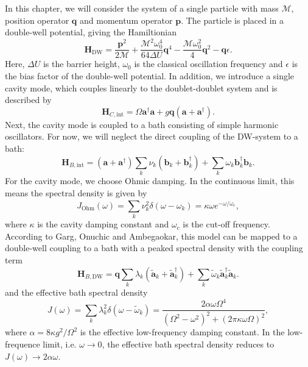 In this chapter, we will consider the system of a single particle with mass $\mathcal{M}$, 
position operator $\mathbf{q}$ and momentum operator $\mathbf{p}$.
The particle is placed in a double-well potential, giving the Hamiltionian
%
\begin{equation}\label{DW_hamiltonian}
    \mathbf{H}_{\text{DW}} = \frac{\mathbf{p}^2}{2 \mathcal{M}}  
    + \frac{\mathcal{M}^2 \omega_0^4}{64 \Delta U} \mathbf{q}^4 
    - \frac{\mathcal{M} \omega_0^2}{4} \mathbf{q}^2
    - \mathbf{q} \epsilon .
\end{equation}
%
Here, $\Delta U$ is the barrier height, $\omega_0$ is the classical oscillation frequency
and $\epsilon$ is the bias factor of the double-well potential.
In addition, we introduce a single cavity mode, which couples linearly to the doublet-doublet
system and is described by
%
\begin{equation}
    \mathbf{H}_{C,\text{int}} = \Omega \mathbf{a}^{\dagger} \mathbf{a}
    + g \mathbf{q} \left( \mathbf{a} + \mathbf{a}^{\dagger} \right) .
\end{equation}
%
Next, the cavity mode is coupled to a bath consisting of simple harmonic oscillators. 
For now, we will neglect the direct coupling of the DW-system to a bath:
%
\begin{equation}
    \mathbf{H}_{B,\text{int}} = \left( \mathbf{a} + \mathbf{a}^{\dagger} \right)
    \sum_{k}^{} \nu_k \left( \mathbf{b}_k + \mathbf{b}^{\dagger}_k  \right) 
    + \sum_{k}^{} \omega_k \mathbf{b}^{\dagger}_k  \mathbf{b}_k  .
\end{equation}
%
For the cavity mode, we choose Ohmic damping. In the continuous limit, this means the 
spectral density is given by
%
\begin{equation}
    J_{\text{Ohm}} \left( \omega \right) = \sum_{k}^{} \nu_k^2 \delta\left( \omega - \omega_k \right) 
    = \kappa \omega e^{- \omega / \omega_c} ,
\end{equation}
%
where $\kappa$ is the cavity damping constant and $\omega_c$ is the cut-off frequency. \\
According to Garg, Onuchic and Ambegaokar, this model can be mapped to a double-well 
coupling to a bath with a peaked spectral density with the coupling term
%
\begin{equation}
    \mathbf{H}_{B,\text{DW}} = \mathbf{q} \sum_{k}^{} \lambda_k \left( \tilde{\mathbf{a}}_k  + \tilde{\mathbf{a}}^\dagger_k  \right) 
    + \sum_{k}^{}\tilde{\omega}_k \tilde{\mathbf{a}}^\dagger_k  \tilde{\mathbf{a}}_k  .
\end{equation}
%
and the effective bath spectral density
%
\begin{equation}\label{bath_spectral_density}
    J \left( \omega \right) = \sum_{k}^{} \lambda_k^2 \delta\left( \omega - \tilde{\omega}_k \right) 
    = \frac{2 \alpha \omega \Omega^4}{ \left( \Omega^2 - \omega^2 \right)^2  + \left( 2 \pi \kappa \omega \Omega  \right)^2 } ,
\end{equation}
%
where $\alpha = 8 \kappa g^2 / \Omega^2$ is the effective low-frequency damping constant.
In the low-frequence limit, i.e. $\omega \rightarrow 0$, the effective bath spectral
density reduces to $J \left( \omega \right) \rightarrow 2 \alpha \omega$.

